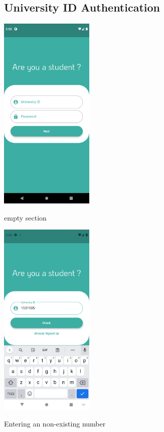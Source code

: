 \documentclass[12pt]{article}
\begin{document}
\begin{figure}[h!]
\subsection*{University ID Authentication}
{\includegraphics[width=0.4\textwidth]{./Screenshots/2.PNG}}
  \caption{empty section}
\end{figure}


\begin{figure}[h!]
{\includegraphics[width=0.4\textwidth]{./Screenshots/3.PNG}}
  \caption{Entering an non-existing number}
\end{figure}
\end{document}
